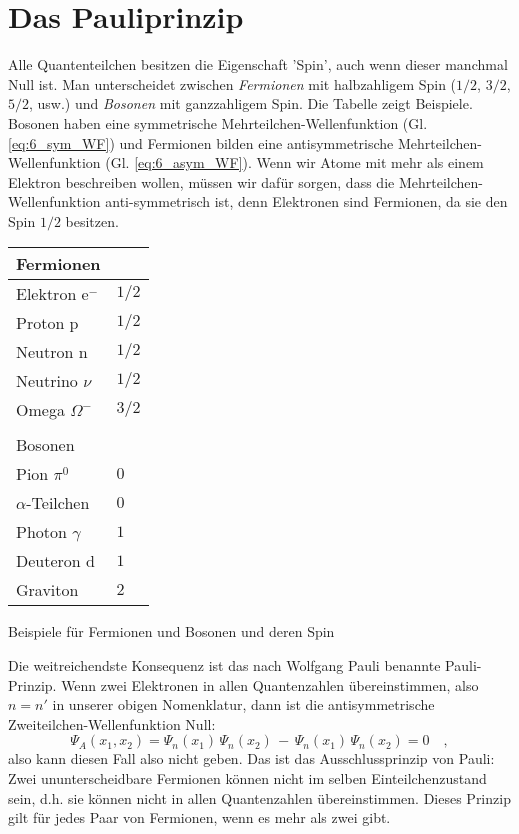 \section{Das Pauliprinzip}


Alle Quantenteilchen besitzen die Eigenschaft 'Spin', auch wenn dieser manchmal Null ist. Man unterscheidet zwischen \emph{Fermionen} mit halbzahligem Spin ($1/2$, $3/2$, $5/2$, usw.) und \emph{Bosonen} mit ganzzahligem Spin. Die Tabelle zeigt Beispiele. Bosonen haben eine symmetrische Mehr\-teil\-chen-Wellenfunktion (Gl. \ref{eq:6_sym_WF}) und Fermionen bilden eine antisymmetrische Mehrteilchen-Wellenfunktion (Gl. \ref{eq:6_asym_WF}). Wenn wir Atome mit mehr als einem Elektron beschreiben wollen, müssen wir dafür sorgen, dass die Mehrteilchen-Wellenfunktion anti-symmetrisch ist, denn Elektronen sind Fermionen, da sie den Spin $1/2$ besitzen.

\begin{marginfigure}
    \begin{tabular}{ll}
        Fermionen & \\
        \hline
        Elektron e$^-$ & $1/2$ \\
        Proton p & $1/2$ \\
        Neutron n & $1/2$ \\
        Neutrino $\nu$ & $1/2$ \\
        Omega $\Omega^-$ & $3/2$ \\
    & \\
    Bosonen & \\
    \hline
    Pion $\pi^0$ & $0$ \\
    $\alpha$-Teilchen & $0$ \\
   Photon $\gamma$ & $1$ \\
   Deuteron d & $1$ \\
    Graviton & $2$ \\
    \end{tabular}
    \caption{Beispiele für  Fermionen und Bosonen und deren Spin}
\end{marginfigure}

Die weitreichendste Konsequenz ist das nach Wolfgang Pauli benannte Pauli-Prinzip. Wenn zwei Elektronen in allen Quantenzahlen übereinstimmen, also $n = n'$ in unserer obigen Nomenklatur, dann ist die antisymmetrische Zweiteilchen-Wellenfunktion Null:
\begin{equation}
    \Psi_A(x_1, x_2) =  \Psi_{n}(x_1) \, \Psi_{n}(x_2) \, - \, \Psi_{n}(x_1) \, \Psi_{n}(x_2) = 0 \quad ,
\end{equation}
also kann  diesen Fall also nicht geben. Das ist das Ausschlussprinzip von Pauli: Zwei ununterscheidbare Fermionen können nicht im selben Einteilchenzustand sein, d.h. sie können nicht in allen Quantenzahlen übereinstimmen. Dieses Prinzip gilt für jedes Paar von Fermionen, wenn es mehr als zwei gibt.

